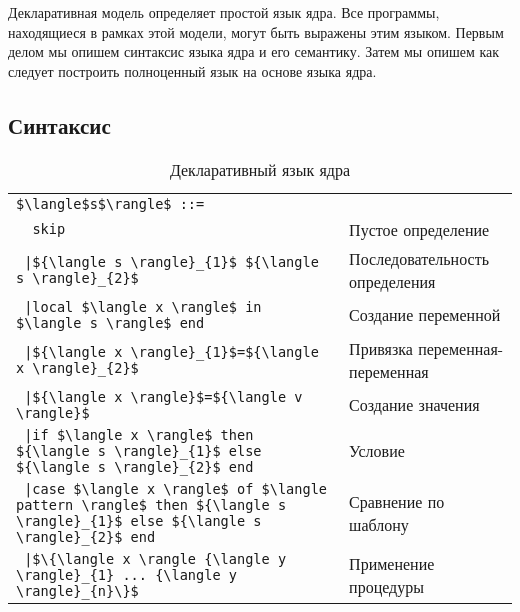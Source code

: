 Декларативная модель определяет простой язык ядра. Все программы, находящиеся в рамках этой модели, могут быть выражены этим языком. Первым делом мы опишем синтаксис языка ядра и его семантику. Затем мы опишем как следует построить полноценный язык на основе языка ядра.

\subsection{Синтаксис}

\begin{table}

  \begin{tabular}{|ll|}
    \hline
    \lstinline|$\langle$s$\rangle$ ::=| & \\
    \lstinline|  skip| & Пустое определение\\
    \lstinline! |${\langle s \rangle}_{1}$ ${\langle s \rangle}_{2}$! & Последовательность определения\\
    \lstinline! |local $\langle x \rangle$ in $\langle s \rangle$ end! & Создание переменной\\
    \lstinline! |${\langle x \rangle}_{1}$=${\langle x \rangle}_{2}$! & Привязка переменная-переменная\\
    \lstinline! |${\langle x \rangle}$=${\langle v \rangle}$! & Создание значения\\
    \lstinline! |if $\langle x \rangle$ then ${\langle s \rangle}_{1}$ else ${\langle s \rangle}_{2}$ end! & Условие\\
    \lstinline! |case $\langle x \rangle$ of $\langle pattern \rangle$ then ${\langle s \rangle}_{1}$ else ${\langle s \rangle}_{2}$ end! & Сравнение по шаблону\\
    \lstinline! |$\{\langle x \rangle {\langle y \rangle}_{1} ... {\langle y \rangle}_{n}\}$! & Применение процедуры\\
    \hline
  \end{tabular}
  
\caption{Декларативный язык ядра}
\label{table:the_declarative_kernel_language}
\end{table}

